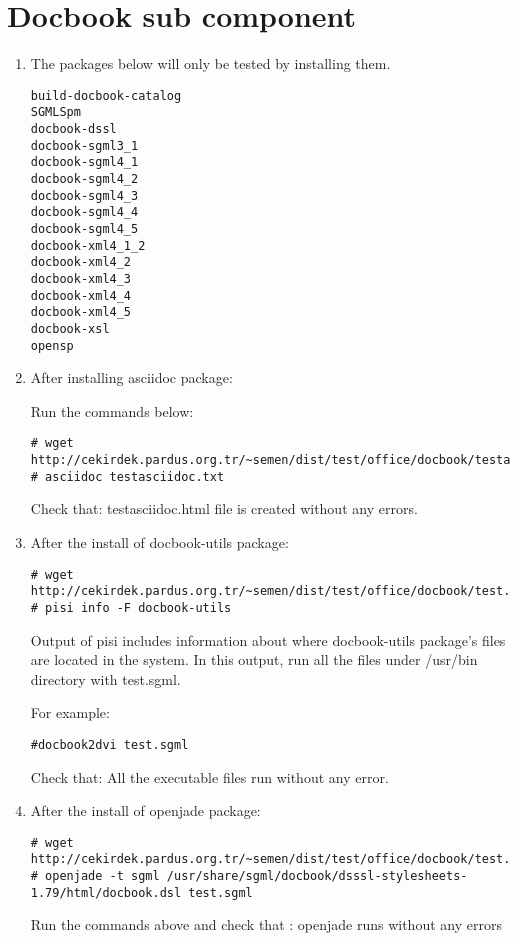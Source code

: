 \documentclass[a4paper,10pt]{article}
\begin{document}
\section{Docbook sub component}
\begin{enumerate}
 \item The packages below will only be tested by installing them.
\begin{verbatim}
build-docbook-catalog
SGMLSpm
docbook-dssl
docbook-sgml3_1
docbook-sgml4_1
docbook-sgml4_2
docbook-sgml4_3
docbook-sgml4_4
docbook-sgml4_5
docbook-xml4_1_2
docbook-xml4_2
docbook-xml4_3
docbook-xml4_4
docbook-xml4_5
docbook-xsl
opensp
\end{verbatim}
 \item After installing asciidoc package:

Run the commands below:
\begin{verbatim}
# wget http://cekirdek.pardus.org.tr/~semen/dist/test/office/docbook/testasciidoc.txt
# asciidoc testasciidoc.txt
\end{verbatim}

Check that: testasciidoc.html file is created without any errors.

\item After the install of docbook-utils package:
\begin{verbatim}
# wget http://cekirdek.pardus.org.tr/~semen/dist/test/office/docbook/test.sgml
# pisi info -F docbook-utils
\end{verbatim}

Output of pisi includes information about where docbook-utils package's files are located in the system. In this output, run all the files under /usr/bin directory with test.sgml.

For example:
\begin{verbatim}
#docbook2dvi test.sgml
\end{verbatim}

Check that: All the executable files run without any error.

\item After the install of openjade package:
\begin{verbatim}
# wget http://cekirdek.pardus.org.tr/~semen/dist/test/office/docbook/test.sgml
# openjade -t sgml /usr/share/sgml/docbook/dsssl-stylesheets-1.79/html/docbook.dsl test.sgml
\end{verbatim}

Run the commands above and check that : openjade runs without any errors


\end{enumerate}
\end{document}
